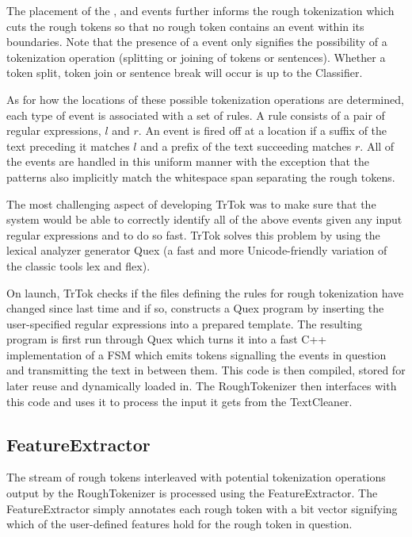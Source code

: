 The placement of the \maysplit{}, \mayjoin{} and \maybreaksentence{}
events further informs the rough tokenization which cuts the rough
tokens so that no rough token contains an event within its boundaries.
Note that the presence of a \may{} event only signifies the
possibility of a tokenization operation (splitting or joining of
tokens or sentences). Whether a token split, token join or sentence
break will occur is up to the Classifier.

As for how the locations of these possible tokenization operations are
determined, each type of event is associated with a set of rules. A
rule consists of a pair of regular expressions, $l$ and $r$. An event
is fired off at a location if a suffix of the text preceding it
matches $l$ and a prefix of the text succeeding matches $r$. All of
the events are handled in this uniform manner with the exception that
the \mayjoin{} patterns also implicitly match the whitespace span
separating the rough tokens.

The most challenging aspect of developing TrTok was to make sure that
the system would be able to correctly identify all of the above events
given any input regular expressions and to do so fast. TrTok solves
this problem by using the lexical analyzer generator Quex (a fast and
more Unicode-friendly variation of the classic tools lex and flex).

On launch, TrTok checks if the files defining the rules for rough
tokenization have changed since last time and if so, constructs a Quex
program by inserting the user-specified regular expressions into a
prepared template. The resulting program is first run through Quex
which turns it into a fast C++ implementation of a FSM which emits
tokens signalling the events in question and transmitting the text in
between them. This code is then compiled, stored for later reuse and
dynamically loaded in. The RoughTokenizer then interfaces with this
code and uses it to process the input it gets from the TextCleaner.

\subsection{FeatureExtractor}

The stream of rough tokens interleaved with potential tokenization
operations output by the RoughTokenizer is processed using the
FeatureExtractor. The FeatureExtractor simply annotates each rough
token with a bit vector signifying which of the user-defined features
hold for the rough token in question.

